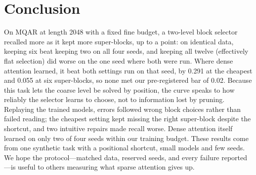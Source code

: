 \section{Conclusion}
\label{sec:conclusion}

On MQAR at length 2048 with a fixed fine budget, a two-level block selector recalled more as it kept more
super-blocks, up to a point: on identical data, keeping six beat keeping two on all four seeds, and keeping all twelve
(effectively flat selection) did worse on the one seed where both were run. Where dense attention learned, it beat
both settings run on that seed, by 0.291 at the cheapest and 0.055 at six super-blocks, so none met our pre-registered bar of 0.02.
Because this task lets the coarse level be solved by position, the curve speaks to how reliably the selector learns to
choose, not to information lost by pruning. Replaying the trained models, errors followed wrong block choices rather than failed
reading; the cheapest setting kept missing the right super-block despite the shortcut, and two intuitive repairs made
recall worse. Dense attention itself learned on only two of four seeds
within our training budget. These results come from one synthetic task with a positional shortcut, small models and few
seeds. We hope the protocol---matched data, reserved seeds, and every failure reported---is useful to others
measuring what sparse attention gives up.
